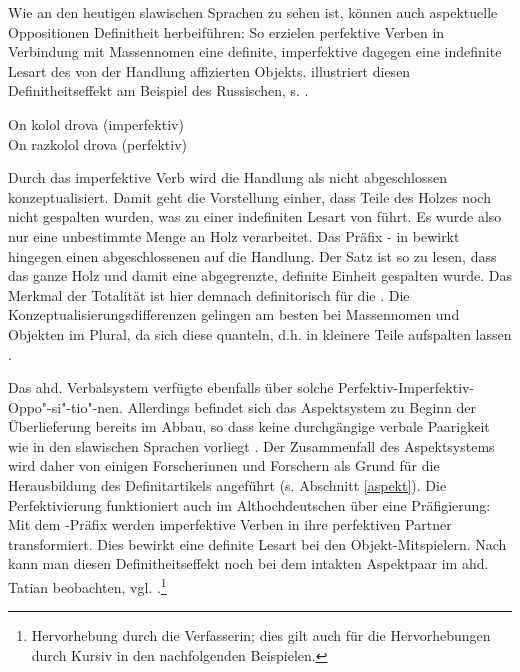 Wie an den heutigen slawischen Sprachen zu sehen ist, können auch aspektuelle  Oppositionen Definitheit  herbeiführen: So erzielen perfektive  Verben in Verbindung mit Massennomen  eine definite, imperfektive  dagegen eine indefinite Lesart  des von der Handlung affizierten Objekts. \textcite[11--14]{Leiss2000} illustriert diesen Definitheitseffekt  am Beispiel des Russischen, s. .

\begin{exe}
\settowidth{}
	\ex \label{ex:russ-aspekt}   
	\begin{xlist}
		\ex \label{ex:russ-imper} On kolol drova \hfill (imperfektiv)\\  
		\ex \label{ex:russ-per} On razkolol drova  \hfill(perfektiv)\\ 
		\end{xlist}
\end{exe}
\noindent
Durch das imperfektive  Verb  wird die Handlung als nicht abgeschlossen konzeptualisiert. Damit  geht die Vorstellung einher, dass Teile des Holzes noch nicht gespalten wurden, was zu einer indefiniten Lesart  von   führt. Es wurde also nur eine unbestimmte Menge an Holz verarbeitet. Das Präfix  - in  bewirkt hingegen einen abgeschlossenen   auf die Handlung. Der Satz ist so zu lesen, dass das ganze Holz und damit eine abgegrenzte, definite Einheit gespalten wurde.
Das Merkmal der Totalität ist hier demnach definitorisch für die  \parencite[14]{Leiss2000}. Die Konzeptualisierungsdifferenzen gelingen am besten bei Massennomen  und Objekten  im Plural, da sich diese quanteln, d.h. in kleinere Teile aufspalten lassen \parencite{Heindl2016}. 

Das ahd. Verbalsystem verfügte ebenfalls über solche  Perfektiv-Imperfektiv-Oppo"-si"-tio"-nen. Allerdings befindet sich das Aspektsystem  zu Beginn der Überlieferung bereits im Abbau, so dass keine durchgängige verbale Paarigkeit wie in den slawischen Sprachen vorliegt \parencite[3]{Eroms1997}. Der Zusammenfall des Aspektsystems  wird daher von einigen Forscherinnen und Forschern als Grund für die Herausbildung des Definitartikels  angeführt (s. Abschnitt \ref{aspekt}). Die Perfektivierung funktioniert auch im Althochdeutschen über eine Präfigierung: Mit dem  -Präfix werden imperfektive  Verben in ihre perfektiven  Partner transformiert. Dies bewirkt eine definite Lesart bei den  Objekt-Mitspielern. Nach \textcite[176--181]{Leiss2000} kann man diesen Definitheitseffekt  noch bei dem intakten Aspektpaar   im ahd. Tatian beobachten, vgl. .\footnote{Hervorhebung durch die Verfasserin; dies gilt auch für die Hervorhebungen durch Kursiv in den nachfolgenden Beispielen.}   

